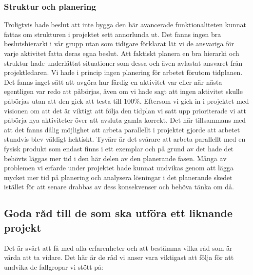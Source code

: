 \documentclass{article}
\begin{document}
\subsubsection{Struktur och planering}
Troligtvis hade beslut att inte bygga den här avancerade funktionaliteten kunnat fattas om strukturen i projektet sett annorlunda ut. Det fanns ingen bra beslutshierarki i vår grupp utan som tidigare förklarat lät vi de ansvariga för varje aktivitet fatta deras egna beslut. Att faktiskt planera en bra hierarki och struktur hade underlättat situationer som dessa och även avlastat ansvaret från projektledaren.
\newline\newline
Vi hade i princip ingen planering för arbetet förutom tidplanen. Det fanns inget sätt att avgöra hur färdig en aktivitet var eller när nästa egentligen var redo att påbörjas, även om vi hade sagt att ingen aktivitet skulle påbörjas utan att den gick att testa till 100\%. Eftersom vi gick in i projektet med visionen om att det är viktigt att följa den tidplan vi satt upp prioriterade vi att påbörja nya aktiviteter över att avsluta gamla korrekt. Det här tillsammans med att det fanns dålig möjlighet att arbeta parallellt i projektet gjorde att arbetet stundvis blev väldigt hektiskt. Tyvärr är det svårare att arbeta parallellt med en fysisk produkt som endast finns i ett exemplar och på grund av det hade det behövts läggas mer tid i den här delen av den planerande fasen. Många av problemen vi erfarde under projektet hade kunnat undvikas genom att lägga mycket mer tid på planering och analysera lösningar i det planerande skedet istället för att senare drabbas av dess konsekvenser och behöva tänka om då.

\subsection{Goda råd till de som ska utföra ett liknande projekt}
Det är svårt att få med alla erfarenheter och att bestämma vilka råd som är värda att ta vidare. Det här är de råd vi anser vara viktigast att följa för att undvika de fallgropar vi stött på:
\end{document}
